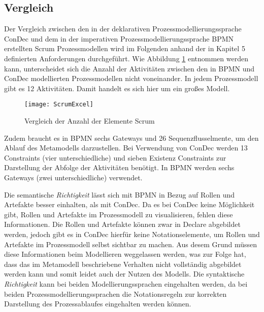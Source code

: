\subsection{Vergleich}

Der Vergleich zwischen den in der deklarativen Prozessmodellierungssprache ConDec und dem in der imperativen Prozessmodellierungssprache BPMN erstellten Scrum Prozessmodellen wird im Folgenden anhand der in Kapitel 5 definierten Anforderungen durchgeführt. \newline
Wie Abbildung \ref{fig:ScrumExcel} entnommen werden kann, unterscheidet sich die Anzahl der Aktivitäten zwischen den in BPMN und ConDec modellierten Prozessmodellen nicht voneinander. In jedem Prozessmodell gibt es 12 Aktivitäten. Damit handelt es sich hier um ein großes Modell.\newline

\begin{figure}[htp]
\begin{center}
  \texttt{[image: ScrumExcel]} %
  \caption{Vergleich der Anzahl der Elemente Scrum}
  \label{fig:ScrumExcel}
\end{center}
\end{figure}


Zudem braucht es in BPMN sechs Gateways und 26 Sequenzflusselmente, um den Ablauf des Metamodells darzustellen. Bei Verwendung von ConDec werden 13 Constraints (vier unterschiedliche) und sieben Existenz Constraints zur Darstellung der Abfolge der Aktivitäten benötigt. In BPMN werden sechs Gateways (zwei unterschiedliche) verwendet.\newline

Die semantische \textit{Richtigkeit} lässt sich mit BPMN in Bezug auf Rollen und Artefakte besser einhalten, als mit ConDec. Da es bei ConDec keine Möglichkeit gibt, Rollen und Artefakte im Prozessmodell zu visualisieren, fehlen diese Informationen. Die Rollen und Artefakte können zwar in Declare abgebildet werden, jedoch gibt es in ConDec hierfür keine Notationselemente, um Rollen und Artefakte im Prozessmodell selbst sichtbar zu machen. Aus desem Grund müssen diese Informationen beim Modellieren weggelassen werden, was zur Folge hat, dass das im Metamodell beschriebene Verhalten nicht vollständig abgebildet werden kann und somit leidet auch der Nutzen des Modells.\newline
Die syntaktische \textit{Richtigkeit} kann bei beiden Modellierungssprachen eingehalten werden, da bei beiden Prozessmodellierungssprachen die Notationsregeln zur korrekten Darstellung des Prozessablaufes eingehalten werden können.\newline

